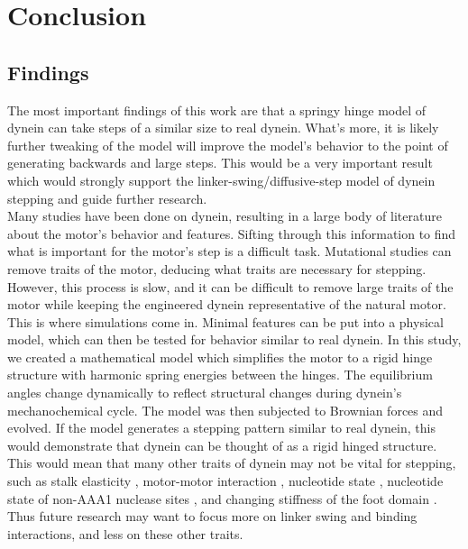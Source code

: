 \documentclass[
11pt, %
english, %
singlespacing, %
headsepline, %
chapterinoneline, %
]{MastersDoctoralThesis} %
\begin{document}
\newpage
\chapter{Conclusion}
\label{chap:Conclusion}


\section{Findings}
The most important findings of this work are that a springy hinge model of dynein can take steps of a similar size to real dynein. What's more, it is likely further tweaking of the model will improve the model's behavior to the point of generating backwards and large steps. This would be a very important result which would strongly support the linker-swing/diffusive-step model of dynein stepping and guide further research.\\

Many studies have been done on dynein, resulting in a large body of literature about the motor's behavior and features. Sifting through this information to find what is important for the motor's step is a difficult task. Mutational studies can remove traits of the motor, deducing what traits are necessary for stepping. However, this process is slow, and it can be difficult to remove large traits of the motor while keeping the engineered dynein representative of the natural motor. This is where simulations come in. Minimal features can be put into a physical model, which can then be tested for behavior similar to real dynein. In this study, we created a mathematical model which simplifies the motor to a rigid hinge structure with harmonic spring energies between the hinges. The equilibrium angles change dynamically to reflect structural changes during dynein's mechanochemical cycle. The model was then subjected to Brownian forces and evolved. If the model generates a stepping pattern similar to real dynein, this would demonstrate that dynein can be thought of as a rigid hinged structure. This would mean that many other traits of dynein may not be vital for stepping, such as stalk elasticity \cite{sarlahmodel}, motor-motor interaction \cite{sarlahmodel}, nucleotide state \cite{cianfroccoreview}, nucleotide state of non-AAA1 nuclease sites \cite{cianfroccoreview}, and changing stiffness of the foot domain \cite{burgess-paper}. Thus future research may want to focus more on linker swing and binding interactions, and less on these other traits.\\
\end{document}
